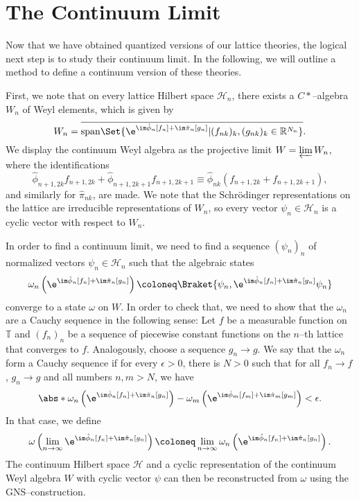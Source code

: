 \section{The Continuum Limit}
\label{sec:The Continuum Limit}
Now that we have obtained quantized versions of our lattice theories, the logical next step is to study their continuum limit.
In the following, we will outline a method to define a continuum version of these theories.

First, we note that on every lattice Hilbert space $\mathcal H_n$, there exists a $C*$--algebra $W_n$ of Weyl elements, which is given by
\begin{equation}
    W_n = \overline{\mathrm{span}\Set{\e^{\im\hat\phi_n[f_n] + \im\hat\pi_n[g_n]} | (f_{nk})_k, (g_{nk})_k \in \mathbb R^{N_n}}} .
\end{equation}
We display the continuum Weyl algebra as the projective limit $W = \varprojlim W_n$, where the identifications
\begin{equation}
    \hat\phi_{n+1,2k}f_{n+1,2k} + \hat\phi_{n+1,2k+1}f_{n+1,2k+1} \equiv \hat\phi_{nk}(f_{n+1,2k} + f_{n+1,2k+1}),
\end{equation}
and similarly for $\hat\pi_{nk}$, are made.
We note that the Schrödinger representations on the lattice are irreducible representations of $W_n$, so every vector $\psi_n\in\mathcal H_n$ is a cyclic vector with respect to $W_n$.

In order to find a continuum limit, we need to find a sequence $(\psi_n)_n$ of normalized vectors $\psi_n\in\mathcal H_n$ such that the algebraic states
\begin{equation}
    \omega_n\left(\e^{\im\hat\phi_n[f_n] + \im\hat\pi_n[g_n]}\right) \coloneq \Braket{\psi_n, \e^{\im\hat\phi_n[f_n] + \im\hat\pi_n[g_n]} \psi_n} \label{eq:algebraic-states}
\end{equation}
converge to a state $\omega$ on $W$.
In order to check that, we need to show that the $\omega_n$ are a Cauchy sequence in the following sense:
Let $f$ be a measurable function on $\mathbb T$ and $(f_n)_n$ be a sequence of piecewise constant functions on the $n$--th lattice that converges to $f$.
Analogously, choose a sequence $g_n\to g$.
We say that the $\omega_n$ form a Cauchy sequence if for every $\epsilon>0$, there is $N>0$ such that for all $f_n\to f$, $g_n\to g$ and all numbers $n,m>N$, we have
\begin{equation}
    \abs*{\omega_n\left(\e^{\im\hat\phi_n[f_n] + \im\hat\pi_n[g_n]}\right) - \omega_m\left(\e^{\im\hat\phi_m[f_m] + \im\hat\pi_m[g_m]}\right)} < \epsilon .
\end{equation}
In that case, we define
\begin{equation}
    \omega\left(\lim_{n\to\infty} \e^{\im\hat\phi_n[f_n] + \im\hat\pi_n[g_n]}\right) \coloneq \lim_{n\to\infty} \omega_n\left(\e^{\im\hat\phi_n[f_n] + \im\hat\pi_n[g_n]}\right) .
\end{equation}
The continuum Hilbert space $\mathcal H$ and a cyclic representation of the continuum Weyl algebra $W$ with cyclic vector $\psi$ can then be reconstructed from $\omega$ using the GNS--construction.

